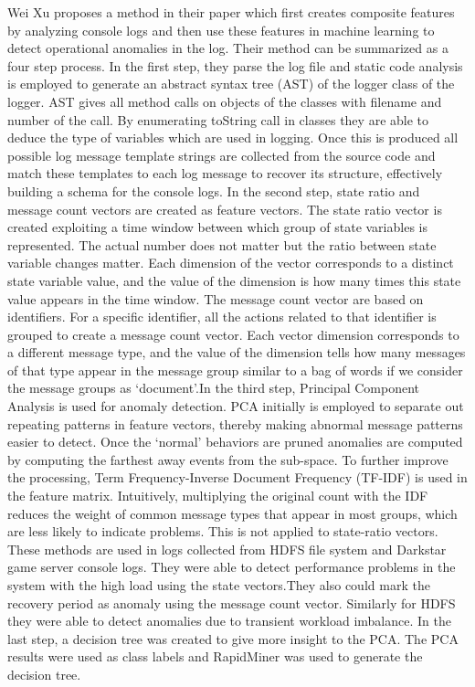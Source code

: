 \documentclass [11pt]{article}
\begin{document}
Wei Xu \cite{Xu2009} proposes a method in their paper which first creates composite features by analyzing console logs and then use these features in machine learning to detect operational anomalies in the log. Their method can be summarized as a four step process. In the first step, they parse the log file and static code analysis is employed to generate an abstract syntax tree (AST) of the logger class of the logger. AST gives all method calls on objects of the classes with filename and number of the call. By enumerating toString call in classes they are able to deduce the type of variables which are used in logging. Once this is produced all possible log message template strings are collected from the source code and match these templates to each log message to recover its structure, effectively building a schema for the console logs. In the second step, state ratio and message count vectors are created as feature vectors. The state ratio vector is created exploiting a time window between which group of state variables is represented. The actual number does not matter but the ratio between state variable changes matter. Each dimension of the vector corresponds to a distinct state variable value, and the value of the dimension is how many times this state value appears in the time window. The message count vector are based on identifiers. For a specific identifier, all the actions related to that identifier is grouped to create a message count vector. Each vector dimension corresponds to a different message type, and the value of the dimension tells how many messages of that type appear in the message group similar to a bag of words if we consider the message groups as `document'.In the third step, Principal Component Analysis is used for anomaly detection. PCA initially is employed to separate out repeating patterns in feature vectors, thereby making abnormal message patterns easier to detect. Once the `normal' behaviors are pruned anomalies are computed by computing the farthest away events from the sub-space. To further improve the processing, Term Frequency-Inverse Document Frequency (TF-IDF) is used in the feature matrix. Intuitively, multiplying the original count with the IDF reduces the weight of common message types that appear in most groups, which are less likely to indicate problems. This is not applied to state-ratio vectors. These methods are used in logs collected from HDFS file system and Darkstar game server console logs. They were able to detect performance problems in the system with the high load using the state vectors.They also could mark the recovery period as anomaly using the message count vector. Similarly for HDFS they were able to detect anomalies due to transient workload imbalance. In the last step, a decision tree was created to give more insight to the PCA. The PCA results were used as class labels and RapidMiner was used to generate the decision tree.
\end{document}
